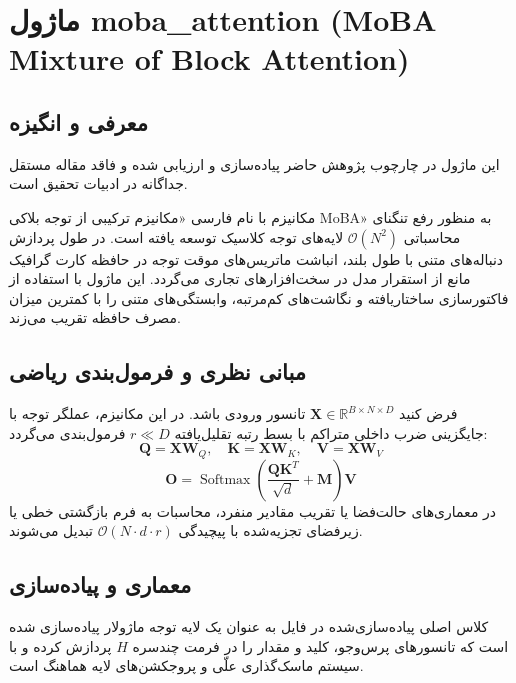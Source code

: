 \section{ماژول moba\_attention (MoBA Mixture of Block Attention)}
\label{sec:module_moba_attention}

\subsection{معرفی و انگیزه}
این ماژول در چارچوب پژوهش حاضر پیاده‌سازی و ارزیابی شده و فاقد مقاله مستقل جداگانه در ادبیات تحقیق است.

مکانیزم  با نام فارسی «مکانیزم ترکیبی از توجه بلاکی MoBA» به منظور رفع تنگنای محاسباتی $\mathcal{O}(N^2)$ لایه‌های توجه کلاسیک توسعه یافته است. در طول پردازش دنباله‌های متنی با طول بلند، انباشت ماتریس‌های موقت توجه در حافظه کارت گرافیک مانع از استقرار مدل در سخت‌افزارهای تجاری می‌گردد. این ماژول با استفاده از فاکتورسازی ساختاریافته و نگاشت‌های کم‌مرتبه، وابستگی‌های متنی را با کمترین میزان مصرف حافظه تقریب می‌زند.

\subsection{مبانی نظری و فرمول‌بندی ریاضی}
فرض کنید $\mathbf{X} \in \mathbb{R}^{B \times N \times D}$ تانسور ورودی باشد. در این مکانیزم، عملگر توجه با جایگزینی ضرب داخلی متراکم با بسط رتبه تقلیل‌یافته $r \ll D$ فرمول‌بندی می‌گردد:
 \begin{equation}
\mathbf{Q} = \mathbf{X} \mathbf{W}_Q, \quad \mathbf{K} = \mathbf{X} \mathbf{W}_K, \quad \mathbf{V} = \mathbf{X} \mathbf{W}_V
\end{equation}
 \begin{equation}
\mathbf{O} = \operatorname{Softmax}\left(\frac{\mathbf{Q} \mathbf{K}^T}{\sqrt{d}} + \mathbf{M}
\right) \mathbf{V}
\end{equation}
در معماری‌های حالت‌فضا یا تقریب مقادیر منفرد، محاسبات به فرم بازگشتی خطی یا زیرفضای تجزیه‌شده با پیچیدگی $\mathcal{O}(N \cdot d \cdot r)$ تبدیل می‌شوند.

\subsection{معماری و پیاده‌سازی}
کلاس اصلی پیاده‌سازی‌شده در فایل  به عنوان یک لایه توجه ماژولار پیاده‌سازی شده است که تانسورهای پرس‌وجو، کلید و مقدار را در فرمت چندسره $H$ پردازش کرده و با سیستم ماسک‌گذاری علّی و پروجکشن‌های لایه هماهنگ است.

